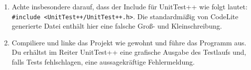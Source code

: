 \begin{enumerate}

\item
Achte insbesondere darauf, dass der Include für UnitTest++ wie folgt lautet: \lstinline|#include <UnitTest++/UnitTest++.h>|.
Die standardmäßig von CodeLite generierte Datei enthält hier eine falsche Groß- und Kleinschreibung.

\item 
Compiliere und linke das Projekt wie gewohnt und führe das Programm aus.
Du erhältst im Reiter UnitTest++ eine grafische Ausgabe des Testlaufs und, falls Tests fehlschlagen, eine aussagekräftige Fehlermeldung.
\end{enumerate}

 

